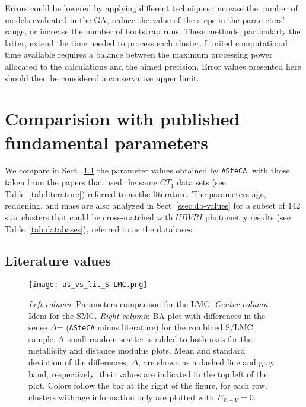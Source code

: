 \documentclass{aa}
\begin{document}
Errors could be lowered by applying different techniques: increase the
number of models evaluated in the GA, reduce the value of the steps in the
parameters' range, or increase the number of bootstrap runs.
%
These methods, particularly the latter, extend the time needed to process
each cluster. Limited computational time available requires a balance between
the maximum processing power allocated to the calculations and the aimed
precision. Error values presented here should then be considered a conservative
upper limit.





\section{Comparision with published fundamental parameters}
\label{sec:comp-pub-data}

We compare in Sect.~\ref{ssec:lit-values} the parameter values obtained by
\texttt{ASteCA}, with those taken from the papers that used the same
$CT_1$ data sets (see Table~\ref{tab:literature}) referred to as the
literature.
%
The parameters age, reddening, and mass are also analyzed in
Sect~\ref{ssec:db-values} for a subset of 142 star clusters that could be
cross-matched with $UBVRI$ photometry results (see Table~\ref{tab:databases}),
referred to as the databases.

  

\subsection{Literature values}
\label{ssec:lit-values}

\begin{figure*}
\texttt{[image: as\_vs\_lit\_S-LMC.png]}
\caption{\emph{Left column}: Parameters comparison for the LMC.\@
\emph{Center column}: Idem for the SMC.\@
\emph{Right column}: BA plot with differences in the sense $\Delta$= (\texttt
{ASteCA} minus literature) for the combined S/LMC sample.
A small random scatter is added to both axes for the metallicity and distance
modulus plots. Mean and standard deviation of the differences,
$\overline{\Delta}$, are shown as a dashed line and gray band, respectively;
their values are indicated in the top left of the plot.
Colors follow the bar at the right of the figure, for each row.~\cite
{Piatti_2011b} clusters with age information only are plotted
with $E_{B-V}{=}0$.}
\label{fig:as_vs_lit}
\end{figure*}
\end{document}
